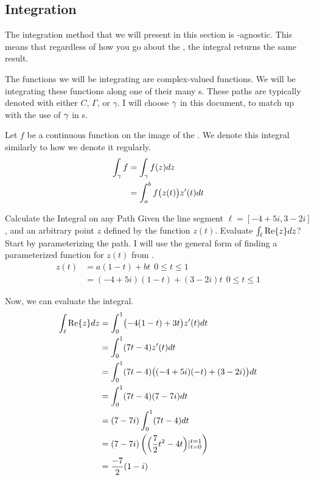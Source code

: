 \subsection{Integration}\label{subsec:Integration}
The integration method that we will present in this section is -agnostic.
This means that regardless of how you go about  the , the integral returns the same result.

The functions we will be integrating are complex-valued functions.
We will be integrating these functions along one of their many s.
These paths are typically denoted with either $C$, $\Gamma$, or $\gamma$.
I will choose $\gamma$ in this document, to match up with the use of $\gamma$ in s.

\begin{definition}\label{def:Integration_on_Paths}
  Let $f$ be a continuous function on the image of the .
  We denote this integral similarly to how we denote it regularly.
  \begin{equation}\label{eq:Integration_on_Paths}
    \begin{aligned}
      \int_{\gamma} f &= \int_{\gamma} f(z) dz \\
      &= \int_{a}^{b} f\bigl( z(t) \bigr) z'(t) dt
    \end{aligned}
  \end{equation}
\end{definition}

\begin{example}[Lecture 7]{Calculate the Integral on any Path}
  Given the line segment $\ell = [-4+5i, 3-2i]$, and an arbitrary point $z$ defined by the function $z(t)$.
  Evaluate $\int_{\ell} \operatorname{Re} \lbrace z \rbrace dz$?
  \tcblower{}
  Start by parameterizing the path.
  I will use the general form of finding a parameterized function for $z(t)$ from .
  \begin{align*}
    z(t) &= a(1-t) + bt \:\: 0 \leq t \leq 1 \\
         &= (-4+5i)(1-t) + (3-2i)t \:\: 0 \leq t \leq 1
  \end{align*}

  Now, we can evaluate the integral.
  \begin{align*}
    \int_{\ell} \operatorname{Re} \lbrace z \rbrace dz &= \int_{0}^{1} \bigl( -4(1-t) + 3t \bigr) z'(t) dt \\
                            &= \int_{0}^{1} (7t - 4) z'(t) dt \\
                            &= \int_{0}^{1} (7t - 4) \bigl( (-4+5i)(-t) + (3-2i) \bigr) dt \\
                            &= \int_{0}^{1} (7t - 4) (7 - 7i) dt \\
                            &= (7-7i) \int_{0}^{1} (7t-4) dt \\
                            &= (7-7i) \left( \Bigl( \frac{7}{2}t^{2}-4t \Bigr) \vert_{t=0}^{t=1} \right) \\
                            &= \frac{-7}{2}(1-i)
  \end{align*}
\end{example}

